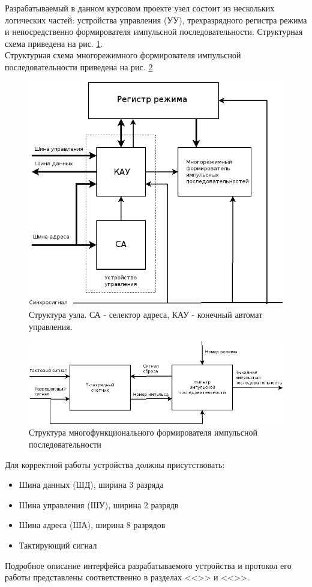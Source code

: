 Разрабатываемый в данном курсовом проекте узел состоит из нескольких логических частей: устройства управления (УУ), трехразрядного регистра режима и непосредственно формирователя импульсной последовательности. Структурная схема приведена на рис. \ref{fig:structure}.\\
Структурная схема многорежимного формирователя импульсной последовательности приведена на рис. \ref{fig:nodestructure}

\begin{figure}
  \includegraphics[scale=0.58]{./structure.png}
  \caption{Структура узла. СА - селектор адреса, КАУ - конечный автомат управления.}
  \label{fig:structure}
\end{figure}

\begin{figure}
  \includegraphics[scale=0.58]{./node-structure.png}
  \caption{Структура многофункционального формирователя импульсной последовательности}
  \label{fig:nodestructure}
\end{figure}

Для корректной работы устройства должны присутствовать:
\begin{itemize}
\item Шина данных (ШД), ширина 3 разряда
\item Шина управления (ШУ), ширина 2 разрядв
\item Шина адреса (ША), ширина 8 разрядов
\item Тактирующий сигнал
\end{itemize}
\noindent Подробное описание интерфейса разрабатываемого устройства и протокол его работы представлены соответственно в разделах <<>> и <<>>.

